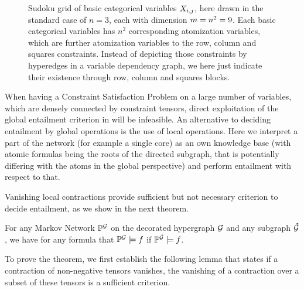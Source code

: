 \begin{example}[Sudoku]
    \begin{figure}
        \begin{center}
            
        \end{center}
        \caption{
            Sudoku grid of basic categorical variables $X_{i,j}$, here drawn in the standard case of $n=3$, each with dimension $m=n^2=9$.
            Each basic categorical variables has $n^2$ corresponding atomization variables, which are further atomization variables to the row, column and squares constraints.
            Instead of depicting those constraints by hyperedges in a variable dependency graph, we here just indicate their existence through row, column and squares blocks.
        }\label{fig:sudokuGrid}
    \end{figure}
\end{example}




\label{subsec:LocalEntailment}

When having a Constraint Satisfaction Problem on a large number of variables, which are densely connected by constraint tensors, direct exploitation of the global entailment criterion in  will be infeasible.
An alternative to deciding entailment by global operations is the use of local operations.
Here we interpret a part of the network (for example a single core) as an own knowledge base (with atomic formulas being the roots of the directed subgraph, that is potentially differing with the atoms in the global perspective) and perform entailment with respect to that.


Vanishing local contractions provide sufficient but not necessary criterion to decide entailment, as we show in the next theorem.

\begin{theorem}
    \label{the:monotonEntailment}
    For any Markov Network $\mathbb{P}^{\mathcal{G}}$ on the decorated hypergraph $\mathcal{G}$ and any subgraph $\tilde{\mathcal{G}}$, we have for any formula that $\mathbb{P}^{\mathcal{G}}\models f$ if $\mathbb{P}^{\tilde{\mathcal{G}}}\models f$.
\end{theorem}

To prove the theorem, we first establish the following lemma that states if a contraction of non-negative tensors vanishes, the vanishing of a contraction over a subset of these tensors is a sufficient criterion.

